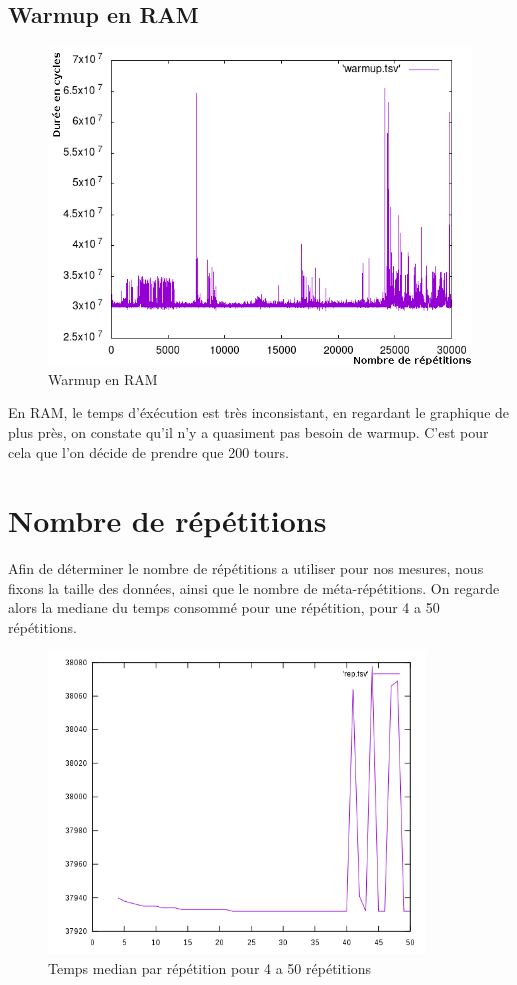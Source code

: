 \documentclass[a4paper]{report}
\begin{document}
\subsection*{Warmup en RAM}
   \begin{figure}[ht!]
        \centering
        \includegraphics[width=120mm]{MEDIA/warmupRAM.png}
        \caption{Warmup en RAM }
    \end{figure}
En RAM, le temps d'éxécution est très inconsistant, en regardant le graphique de plus près, on constate qu'il n'y a quasiment pas besoin de warmup. C'est pour cela que l'on décide de prendre que 200 tours.
\newpage
\section*{Nombre de répétitions}
Afin de déterminer le nombre de répétitions a utiliser pour nos mesures, nous fixons la taille des données, ainsi que le nombre de méta-répétitions. On regarde alors la mediane du temps consommé pour une répétition, pour 4 a 50 répétitions.
\begin{figure}[ht!]
    \centering
    \includegraphics[width=100mm]{MEDIA/rep.png}
    \caption{Temps median par répétition pour 4 a 50 répétitions}
\end{figure}
\end{document}
